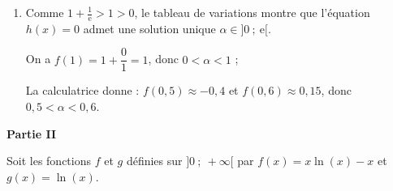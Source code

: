 \documentclass[10pt]{article}
\providecommand{\e}{{\mathrm{e}}}
\begin{document}
\begin{enumerate}

D'où le tableau de variations de $h$ :

\begin{center}
{\renewcommand{\arraystretch}{1.3}
\def\esp{\hspace*{2.5cm}}
\def\hauteur{0pt}
$\begin{array}{|c|l*4{c}|}
\hline
x & 0  & \esp & \e\, & \esp & +\infty \\ 
\hline
h'(x) & \vline\;\vline &   \pmb{+} & \vline\hspace{-2.7pt}0 & \pmb{-} & \\ 
\hline
 &  \vline\;\vline & &   \Rnode{max}{1+\frac{1}{\e}}  &  &   \\  
h &\vline\;\vline &     &  &  &  \rule{0pt}{\hauteur} \\ 
 &\vline\;\vline \Rnode{min1}{~-\infty} &   &  &  &   \Rnode{min2}{1} \rule{0pt}{\hauteur}    
 \ncline{->}{min1}{max} 
 \ncline{->}{max}{min2} 
 \\ 
\hline
\end{array} $
}
\end{center}	

\item 
Comme $1 + \frac{1}{\text{e}} > 1 > 0$, le tableau de variations montre que l'équation $h(x) = 0$ admet une solution unique $\alpha \in ]0~;~\text{e}[$.

On a $f(1) = 1 + \dfrac{0}{1} = 1$, donc $0 < \alpha < 1$ ;

La calculatrice donne :
$f(0,5) \approx - 0,4$ et $f(0,6) \approx 0,15$, donc $0,5 < \alpha < 0,6$.

\end{enumerate}

\bigskip

\textbf{Partie II}

\medskip

Soit les fonctions $f$ et $g$ définies sur $]0~;~ +\infty[$ par
$f(x) = x \ln (x) - x$ et $g(x) = \ln (x).$
\end{document}
